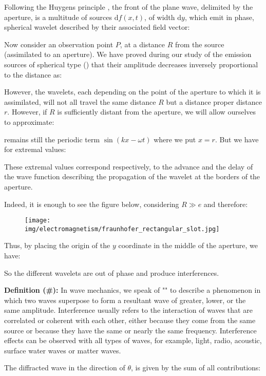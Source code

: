 	Following the Huygens principle , the front of the plane wave, delimited by the aperture, is a multitude of sources $\mathrm{d}f(x,t)$, of width $\mathrm{d}y$, which emit in phase, spherical wavelet described by their associated field vector:
	
	Now consider an observation point $P$, at a distance $R$ from the source (assimilated to an aperture). We have proved during our study of the emission sources of spherical type  () that their amplitude decreases inversely proportional to the distance as:
	
	However, the wavelets, each depending on the point of the aperture to which it is assimilated, will not all travel the same distance $R$ but a distance proper distance $r$. However, if $R$ is sufficiently distant from the aperture, we will allow ourselves to approximate:
	
	remains still the periodic term $\sin(kx-\omega t)$ where we put $x=r$. But we have for extremal values:
	
	These extremal values correspond respectively, to the  advance and the delay of the wave function describing the propagation of the wavelet at the borders of the aperture.
	
	Indeed, it is enough to see the figure below, considering $R \gg e$ and therefore:
	
	\begin{figure}[H]
		\centering
		\texttt{[image: img/electromagnetism/fraunhofer\_rectangular\_slot.jpg]}
	\end{figure}
	Thus, by placing the origin of the $y$ coordinate in the middle of the aperture, we have:
	
	So the different wavelets are out of phase and produce interferences.
	
	\textbf{Definition (\#\mydef):} In wave mechanics, we speak of "" to describe a phenomenon in which two waves superpose to form a resultant wave of greater, lower, or the same amplitude. Interference usually refers to the interaction of waves that are correlated or coherent with each other, either because they come from the same source or because they have the same or nearly the same frequency. Interference effects can be observed with all types of waves, for example, light, radio, acoustic, surface water waves or matter waves.
	
	The diffracted wave in the direction of $\theta$, is given by the sum of all contributions:
	
